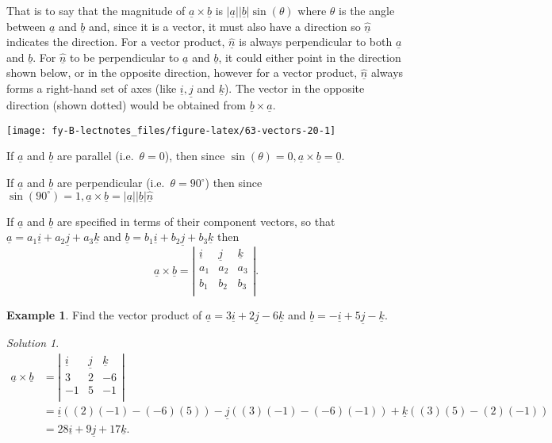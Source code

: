 \documentclass[
  11pt,
  oneside]{book}
\newcommand{\slide}{}
\theoremstyle{definition}
\theoremstyle{definition}
\newtheorem{example}{Example}[chapter]
\theoremstyle{definition}
\theoremstyle{definition}
\theoremstyle{remark}
\newtheorem*{solution}{Solution}
\begin{document}
That is to say that the magnitude of \(\underline a\times\underline b\) is \(|\underline a||\underline b|\sin(\theta)\) where \(\theta\) is the angle between \(\underline a\) and \(\underline b\) and, since it is a vector, it must also have a direction so \(\underline{\hat n}\) indicates the direction. For a vector product, \(\underline {\hat n}\) is always perpendicular to both \(\underline a\) and \(\underline b\). For \(\underline {\hat n}\) to be perpendicular to \(\underline a\) and \(\underline b\), it could either point in the direction shown below, or in the opposite direction, however for a vector product, \(\underline {\hat n}\) always forms a right-hand set of axes (like \(\underline i, \underline j\) and \(\underline k\)). The vector in the opposite direction (shown dotted) would be obtained from \(\underline b\times\underline a\).

\begin{center}\texttt{[image: fy-B-lectnotes\_files/figure-latex/63-vectors-20-1]} \end{center}

If \(\underline a\) and \(\underline b\) are parallel (i.e.~\(\theta = 0\)), then since \(\sin(\theta) = 0, \underline a \times\underline b = {\underline 0}\).

If \(\underline a\) and \(\underline b\) are perpendicular (i.e.~\(\theta = 90^\circ\)) then since \(\sin(90^\circ)= 1, \underline a \times\underline b = |\underline a||\underline b|\underline {\hat n}\)

If \(\underline a\) and \(\underline b\) are specified in terms of their component vectors, so that \(\underline a = a_1\underline i + a_2\underline j + a_3\underline k\) and \(\underline b = b_1\underline i + b_2\underline j + b_3\underline k\) then
\[
\underline a \times\underline b = \left|\begin{array}{ccc}\underline i&\underline j&\underline k\\a_1&a_2&a_3\\b_1&b_2&b_3\\\end{array}\right|.
\]
\slide

\begin{example}
Find the vector product of \(\underline a=3\underline i+2\underline j-6\underline k\) and \(\underline b=-\underline i + 5\underline j-\underline k\).
\end{example}

\begin{solution}
\begin{align*}
\underline a \times\underline b& = \left|\begin{array}{ccc}\underline i&\underline j&\underline k\\3&2&-6\\-1&5&-1\\\end{array}\right|\\
&= \underline i((2)(-1)-(-6)(5))-\underline j((3)(-1)-(-6)(-1))+\underline k((3)(5)-(2)(-1))\\
&=28\underline i+9\underline j+17\underline k.
\end{align*}
\end{solution}
\end{document}
